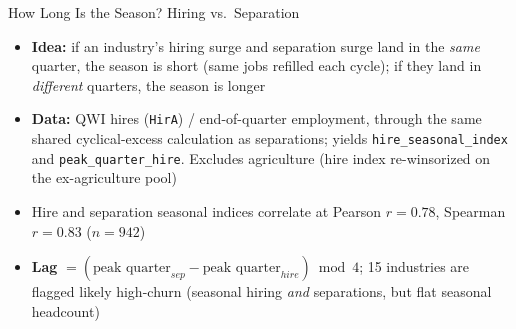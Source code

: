 \documentclass[aspectratio=169]{beamer}
\begin{document}
\begin{frame}{How Long Is the Season? Hiring vs.\ Separation}
  \small
  \begin{itemize}
    \item \textbf{Idea:} if an industry's hiring surge and separation surge
          land in the \emph{same} quarter, the season is short (same jobs
          refilled each cycle); if they land in \emph{different} quarters,
          the season is longer
    \item \textbf{Data:} QWI hires (\texttt{HirA}) / end-of-quarter
          employment, through the same shared cyclical-excess calculation as
          separations; yields \texttt{hire\_seasonal\_index} and
          \texttt{peak\_quarter\_hire}. Excludes agriculture (hire index
          re-winsorized on the ex-agriculture pool)
    \item Hire and separation seasonal indices correlate at Pearson
          $r = 0.78$, Spearman $r = 0.83$ ($n = 942$)
    \item \textbf{Lag} $= (\text{peak quarter}_{sep} - \text{peak
          quarter}_{hire}) \bmod 4$; 15 industries are flagged likely
          high-churn (seasonal hiring \emph{and} separations, but flat
          seasonal headcount)
  \end{itemize}
\end{frame}
\end{document}
